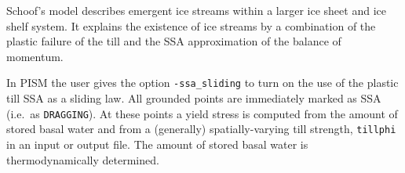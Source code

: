 Schoof's model \cite{SchoofStream} describes emergent ice streams within a larger ice sheet and ice shelf system.  It explains the existence of ice streams by a combination of the plastic failure of the till and the SSA approximation of the balance of momentum.  

In PISM the user gives the option \texttt{-ssa_sliding} to turn on the use of the plastic till SSA as a sliding law.  All grounded points are immediately marked as SSA (i.e.~as \texttt{DRAGGING}).  At these points a yield stress is computed from the amount of stored basal water and from a (generally) spatially-varying till strength, \texttt{tillphi} in an input or output file.  The amount of stored basal water is thermodynamically determined.





\tablelasttail{\bottomrule}

